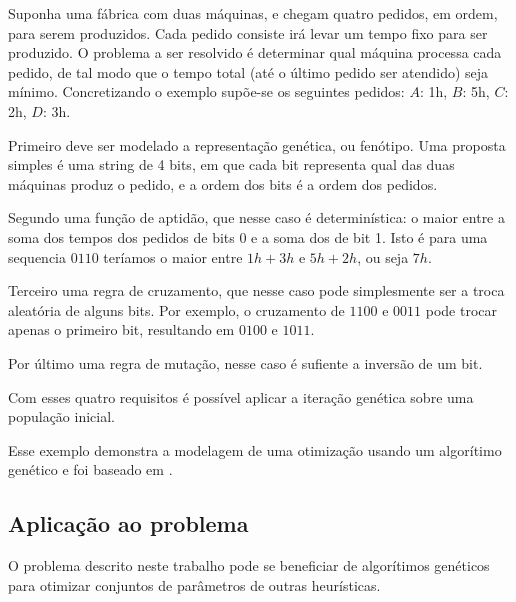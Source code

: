Suponha uma fábrica com duas máquinas, e chegam quatro pedidos, em ordem, para serem produzidos.
Cada pedido consiste irá levar um tempo fixo para ser produzido.
O problema a ser resolvido é determinar qual máquina processa cada pedido, de tal modo que
o tempo total (até o último pedido ser atendido) seja mínimo.
Concretizando o exemplo supõe-se os seguintes pedidos: $A$: 1h, $B$: 5h, $C$: 2h, $D$: 3h.

Primeiro deve ser modelado a representação genética, ou fenótipo.
Uma proposta simples é uma string de 4 bits, em que cada bit representa qual das duas máquinas produz
o pedido, e a ordem dos bits é a ordem dos pedidos.

Segundo uma função de aptidão, que nesse caso é determinística: o maior entre a soma dos tempos dos pedidos
de bits 0 e a soma dos de bit 1. Isto é para uma sequencia $0110$ teríamos o maior entre $1h + 3h$ e $5h + 2h$,
ou seja $7h$.

Terceiro uma regra de cruzamento, que nesse caso pode simplesmente ser a troca aleatória de alguns bits.
Por exemplo, o cruzamento de $1100$ e $0011$ pode trocar apenas o primeiro bit, resultando em $0100$ e $1011$.

Por último uma regra de mutação, nesse caso é sufiente a inversão de um bit.

Com esses quatro requisitos é possível aplicar a iteração genética sobre uma população inicial.

Esse exemplo demonstra a modelagem de uma otimização usando um algorítimo genético e foi baseado em \cite{vieira2002algogeneticos}.


\subsection{Aplicação ao problema}

O problema descrito neste trabalho pode se beneficiar de algorítimos genéticos para otimizar conjuntos de
parâmetros de outras heurísticas.
